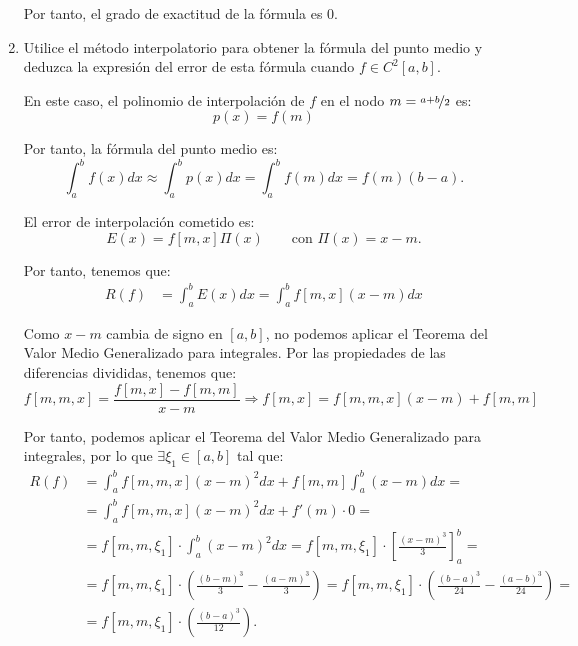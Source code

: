 \begin{ejercicio}
\begin{enumerate}
        Por tanto, el grado de exactitud de la fórmula es 0.
        \item Utilice el método interpolatorio para obtener la fórmula del punto medio y deduzca la expresión del error de esta fórmula cuando $f \in C^2[a, b]$.
        
        En este caso, el polinomio de interpolación de $f$ en el nodo $m=\nicefrac{a + b}{2}$ es:
        \begin{equation*}
            p(x) = f(m)
        \end{equation*}

        Por tanto, la fórmula del punto medio es:
        \begin{equation*}
            \int_{a}^{b} f(x) dx \approx \int_{a}^{b} p(x) dx = \int_{a}^{b} f(m) dx = f(m)(b - a).
        \end{equation*}

        El error de interpolación cometido es:
        \begin{equation*}
            E(x) = f[m,x]\Pi(x)\qquad \text{con } \Pi(x) = x - m.
        \end{equation*}

        Por tanto, tenemos que:
        \begin{align*}
            R(f) &= \int_{a}^{b} E(x) dx = \int_{a}^{b} f[m,x](x - m) dx
        \end{align*}

        Como $x - m$ cambia de signo en $[a, b]$, no podemos aplicar el Teorema del Valor Medio Generalizado para integrales. Por las propiedades de las diferencias divididas, tenemos que:
        \begin{equation*}
            f[m,m,x] = \dfrac{f[m,x] - f[m,m]}{x - m}
            \Longrightarrow f[m,x] = f[m,m,x] (x - m) + f[m,m]
        \end{equation*}

        Por tanto, podemos aplicar el Teorema del Valor Medio Generalizado para integrales, por lo que $\exists \xi_1 \in [a, b]$ tal que:
        \begin{align*}
            R(f) &= \int_{a}^{b} f[m,m,x] (x - m)^2 dx + f[m,m]\int_{a}^{b} (x - m) dx
            =\\&= \int_{a}^{b} f[m,m,x] (x - m)^2 dx + f'(m)\cdot 0
            =\\&= f[m,m,\xi_1] \cdot \int_{a}^{b} (x - m)^2 dx
            = f[m,m,\xi_1] \cdot \left[ \frac{(x - m)^3}{3} \right]_{a}^{b}
            =\\&= f[m,m,\xi_1] \cdot \left( \frac{(b - m)^3}{3} - \frac{(a - m)^3}{3} \right)
            = f[m,m,\xi_1] \cdot \left( \frac{(b - a)^3}{24} - \frac{(a-b)^3}{24} \right)
            =\\&= f[m,m,\xi_1] \cdot \left( \frac{(b - a)^3}{12} \right).
        \end{align*}


\end{enumerate}
\end{ejercicio}
